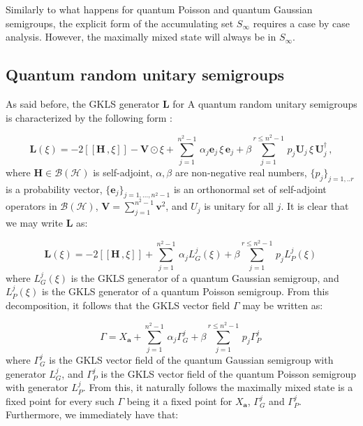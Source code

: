 \documentclass[11pt]{article}
\newcommand{\be}{\begin{equation}}
\newcommand{\ee}{\end{equation}}
\begin{document}
Similarly to what happens for quantum Poisson and quantum Gaussian semigroups, the explicit form of the accumulating set $S_{\infty}$ requires a case by case analysis.
However, the maximally mixed state will always be in $S_{\infty}$.


\subsection{Quantum random unitary semigroups}

As said before, the GKLS generator $\mathbf{L}$ for A quantum random unitary semigroups is characterized by the following form \cite{aniello_kossakowski_marmo_ventriglia-quantum_brownian_motion_on_lie_groups_and_open_quantum_systems} :

\be
\mathbf{L}(\xi)=-2[[\mathbf{H}\,,\xi]] - \mathbf{V}\odot\xi + \sum_{j=1}^{n^{2}-1}\,\alpha_{j}\mathbf{e}_{j}\,\xi\,\mathbf{e}_{j} + \beta\sum_{j=1}^{r\leq n^{2}-1}\,p_{j}\mathbf{U}_{j}\,\xi\,\mathbf{U}_{j}^{\dagger}\,,
\ee
where $\mathbf{H}\in\mathcal{B}(\mathcal{H})$ is self-adjoint, $\alpha,\beta$ are non-negative real numbers, $\{p_{j}\}_{j=1,..r}$ is a probability vector, $\{\mathbf{e}_{j}\}_{j=1,...,n^{2}-1}$ is an orthonormal set of self-adjoint operators in $\mathcal{B}(\mathcal{H})$, $\mathbf{V}=\sum_{j=1}^{n^{2}-1}\mathbf{v}^{2}$, and $U_{j}$ is unitary for all $j$.
It is clear that we may write $\mathbf{L}$ as:

\be
\mathbf{L}(\xi)= -2[[\mathbf{H}\,,\xi]] + \sum_{j=1}^{n^{2}-1}\,\alpha_{j} L_{G}^{j}(\xi) + \beta\sum_{j=1}^{r\leq n^{2}-1}\,p_{j}L_{P}^{j}(\xi)\,
\ee
where $L_{G}^{j}(\xi)$ is the GKLS generator of a quantum Gaussian semigroup, and $L_{P}^{j}(\xi)$ is the GKLS generator of a quantum Poisson semigroup.
From this decomposition, it follows that the GKLS vector field $\Gamma$ may be written as:

\be\label{eqn: GKLS vector field for quantum random unitary semigroups}
\Gamma=X_{\mathbf{a}} +  \sum_{j=1}^{n^{2}-1}\,\alpha_{j} \Gamma_{G}^{j} + \beta\sum_{j=1}^{r\leq n^{2}-1}\,p_{j}\Gamma_{P}^{j}\,
\ee
where $\Gamma_{G}^{j}$ is the GKLS vector field of the quantum Gaussian semigroup with generator $L_{G}^{j}$, and $\Gamma_{P}^{j}$ is the GKLS vector field of the quantum Poisson semigroup with generator $L_{P}^{j}$.
From this, it naturally follows the maximally mixed state is a fixed point for every such $\Gamma$ being it a fixed point for $X_{\mathbf{a}}$, $\Gamma_{G}^{j}$ and $\Gamma_{P}^{j}$.
Furthermore, we immediately have that:
\end{document}
